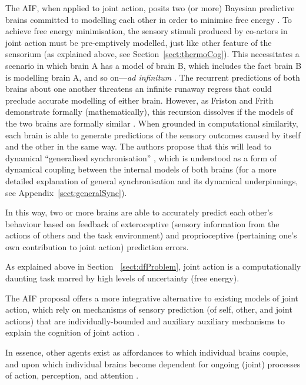 \begin{CJK}{UTF8}{gbsn}
The AIF, when applied to joint action, posits two (or more) Bayesian predictive brains committed to modelling each other in order to minimise free energy \citep{Moutoussis2014,Friston2015,Friston2015a}. To achieve free energy minimisation, the sensory stimuli produced by co-actors in joint action must be pre-emptively modelled, just like other feature of the sensorium (as explained above, see Section~\ref{sect:thermoCog}).  This necessitates a scenario in which brain A has a model of brain B, which includes the fact brain B is modelling brain A, and so on---\textit{ad infinitum} \citep{Friston2015}.  The recurrent predictions of both brains about one another threatens an infinite runaway regress that could preclude accurate modelling of either brain.  However, as Friston and Frith demonstrate formally (mathematically), this recursion dissolves if the models of the two brains are formally similar \citep{Friston2015,Friston2015a}.  When grounded in computational similarity, each brain is able to generate predictions of the sensory outcomes caused by itself and the other in the same way.  The authors propose that this will lead to dynamical ``generalised synchronisation'' \citep{Barreto2003}, which is understood as a form of dynamical coupling between the internal models of both brains (for a more detailed explanation of general synchronisation and its dynamical underpinnings, see Appendix~\ref{sect:generalSync}).

In this way, two or more brains are able to accurately predict each other's behaviour based on feedback of exteroceptive (sensory information from the actions of others and the task environment) and proprioceptive (pertaining one's own contribution to joint action) prediction errors.

As explained above in Section ~\ref{sect:dfProblem}, joint action is a computationally daunting task marred by high levels of uncertainty (free energy).

The AIF proposal offers a more integrative alternative to existing models of joint action, which rely on mechanisms of sensory prediction (of self, other, and joint actions) that are individually-bounded and auxiliary auxiliary mechanisms to explain the cognition of joint action \citep[][; for an AFM model of coordination in joint action, see Appendix ~\ref{app2:AFMapproachJA}]{Pesquita2017}.


In essence, other agents exist as affordances to which individual brains couple, and upon which individual brains become dependent for ongoing (joint) processes of action, perception, and attention \citep{Friston2015a}.


\end{CJK}
